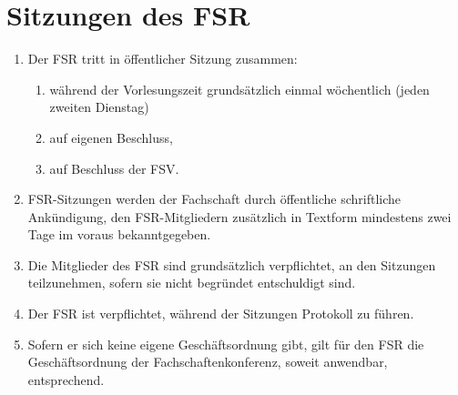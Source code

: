 \documentclass{article}
\begin{document}
\section{Sitzungen des FSR}
\begin{enumerate}[(1)]
    \item Der FSR tritt in öffentlicher Sitzung zusammen:
    \begin{enumerate}[1.]
        \item während der Vorlesungszeit grundsätzlich einmal wöchentlich (jeden zweiten Dienstag)
        \item auf eigenen Beschluss,
        \item auf Beschluss der FSV.
    \end{enumerate}
    \item FSR-Sitzungen werden der Fachschaft durch öffentliche schriftliche Ankündigung, den FSR-Mitgliedern zusätzlich in Textform mindestens zwei Tage im voraus bekanntgegeben.
    \item Die Mitglieder des FSR sind grundsätzlich verpflichtet, an den Sitzungen teilzunehmen, sofern sie nicht begründet entschuldigt sind.
    \item Der FSR ist verpflichtet, während der Sitzungen Protokoll zu führen.
    \item Sofern er sich keine eigene Geschäftsordnung gibt, gilt für den FSR die Geschäftsordnung der Fachschaftenkonferenz, soweit anwendbar, entsprechend.
\end{enumerate}
\end{document}
